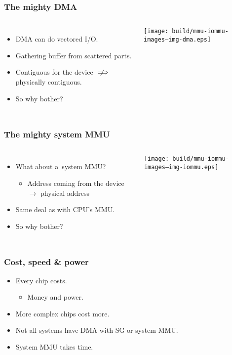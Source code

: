 \begin{frame}
  \frametitle{The mighty DMA}

  \begin{columns}[c]

    \begin{itemize}
    \item DMA can do vectored I/O.
    \item Gathering buffer from scattered parts.
    \item Contiguous for the device $\notimplies$ physically contiguous.
    \item So why bother?
    \end{itemize}

    \begin{center}
      \texttt{[image: build/mmu-iommu-images--img-dma.eps]}
    \end{center}

  \end{columns}
\end{frame}

\begin{frame}
  \frametitle{The mighty system MMU}

  \begin{columns}[c]

    \begin{itemize}
    \item What about a~system MMU?
      \begin{itemize}
      \item Address coming from the device $\rightarrow$ physical
        address
      \end{itemize}
    \item Same deal as with CPU's MMU.
    \item So why bother?
    \end{itemize}

    \begin{center}
      \texttt{[image: build/mmu-iommu-images--img-iommu.eps]}
    \end{center}

  \end{columns}
\end{frame}

\begin{frame}
  \frametitle{Cost, speed \& power}

  \begin{itemize}
  \item Every chip costs.
    \begin{itemize}
    \item Money and power.
    \end{itemize}
  \item More complex chips cost more.
  \item Not all systems have DMA with SG or system MMU.
  \item System MMU takes time.
  \end{itemize}
\end{frame}
